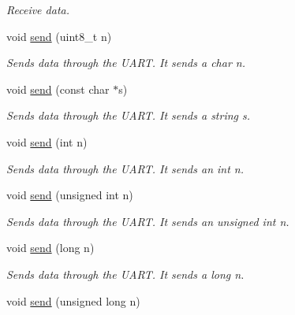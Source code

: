 \begin{DoxyCompactItemize}
\begin{DoxyCompactList}\small\item\em Receive data. \end{DoxyCompactList}\item 
void \hyperlink{class_wasp232_a40f316c2030eb1919a202258574c96e5}{send} (uint8\+\_\+t n)\hypertarget{class_wasp232_a40f316c2030eb1919a202258574c96e5}{}\label{class_wasp232_a40f316c2030eb1919a202258574c96e5}

\begin{DoxyCompactList}\small\item\em Sends data through the U\+A\+RT. It sends a char n. \end{DoxyCompactList}\item 
void \hyperlink{class_wasp232_a477a3b28efcb735fc8b196545b8b4fd5}{send} (const char $\ast$s)\hypertarget{class_wasp232_a477a3b28efcb735fc8b196545b8b4fd5}{}\label{class_wasp232_a477a3b28efcb735fc8b196545b8b4fd5}

\begin{DoxyCompactList}\small\item\em Sends data through the U\+A\+RT. It sends a string s. \end{DoxyCompactList}\item 
void \hyperlink{class_wasp232_a90de5e77fa872071edea9034ddfd8f67}{send} (int n)\hypertarget{class_wasp232_a90de5e77fa872071edea9034ddfd8f67}{}\label{class_wasp232_a90de5e77fa872071edea9034ddfd8f67}

\begin{DoxyCompactList}\small\item\em Sends data through the U\+A\+RT. It sends an int n. \end{DoxyCompactList}\item 
void \hyperlink{class_wasp232_aed7b4729afd9bf90b92e16eb3dba4f21}{send} (unsigned int n)\hypertarget{class_wasp232_aed7b4729afd9bf90b92e16eb3dba4f21}{}\label{class_wasp232_aed7b4729afd9bf90b92e16eb3dba4f21}

\begin{DoxyCompactList}\small\item\em Sends data through the U\+A\+RT. It sends an unsigned int n. \end{DoxyCompactList}\item 
void \hyperlink{class_wasp232_a8c6ffd1aa3eb04ede825a3d47bec1838}{send} (long n)\hypertarget{class_wasp232_a8c6ffd1aa3eb04ede825a3d47bec1838}{}\label{class_wasp232_a8c6ffd1aa3eb04ede825a3d47bec1838}

\begin{DoxyCompactList}\small\item\em Sends data through the U\+A\+RT. It sends a long n. \end{DoxyCompactList}\item 
void \hyperlink{class_wasp232_a75fc1cbb03c406fce9802dc0fe2546ac}{send} (unsigned long n)\hypertarget{class_wasp232_a75fc1cbb03c406fce9802dc0fe2546ac}{}\label{class_wasp232_a75fc1cbb03c406fce9802dc0fe2546ac}


\end{DoxyCompactItemize}
